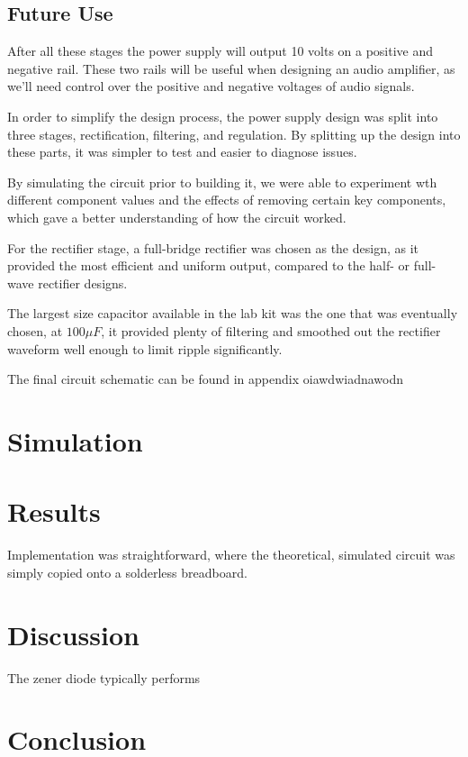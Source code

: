 \documentclass[12pt]{article}
\begin{document}
\subsection{Future Use}
After all these stages the power supply will output 10 volts on a positive and negative rail. These two rails will be useful when designing an audio amplifier, as we'll need control over the 
positive and negative voltages of audio signals.

In order to simplify the design process, the power supply design was split into three
stages, rectification, filtering, and regulation. By splitting up the design into these
parts, it was simpler to test and easier to diagnose issues.

By simulating the circuit prior to building it, we were able to experiment wth different
component values and the effects of removing certain key components, which gave a better
understanding of how the circuit worked.

For the rectifier stage, a full-bridge rectifier was chosen as the design, as it provided
the most efficient and uniform output, compared to the half- or full-wave rectifier designs.

The largest size capacitor available in the lab kit was the one that was eventually chosen,
at $100 \mu F$, it provided plenty of filtering and smoothed out the rectifier waveform
well enough to limit ripple significantly.

The final circuit schematic can be found in appendix oiawdwiadnawodn

\section{Simulation}

\section{Results}

Implementation was straightforward, where the theoretical, simulated circuit was simply
copied onto a solderless breadboard. 

\section{Discussion}

The zener diode typically performs

\section{Conclusion}
\end{document}
